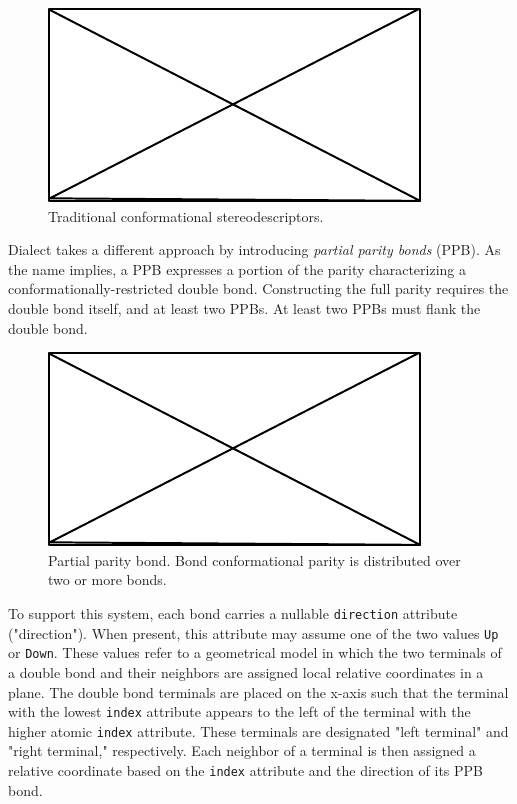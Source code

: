 \documentclass{article}
\def\ttt{\texttt}
\begin{document}
\begin{figure}
    \centering
    \includegraphics{filler}
    \caption{Traditional conformational stereodescriptors.}
    \label{fig:traditional-conformational-stereodescriptors}
\end{figure}

Dialect takes a different approach by introducing \textit{partial parity bonds} (PPB). As the name implies, a PPB expresses a portion of the parity characterizing a conformationally-restricted double bond. Constructing the full parity requires the double bond itself, and at least two PPBs. At least two PPBs must flank the double bond.

\begin{figure}
    \centering
    \includegraphics{filler}
    \caption{Partial parity bond. Bond conformational parity is distributed over two or more bonds.}
    \label{fig:partial-parity-bonds}
\end{figure}

To support this system, each bond carries a nullable \ttt{direction} attribute ("direction"). When present, this attribute may assume one of the two values \ttt{Up} or \ttt{Down}. These values refer to a geometrical model in which the two terminals of a double bond and their neighbors are assigned local relative coordinates in a plane. The double bond terminals are placed on the x-axis such that the terminal with the lowest \ttt{index} attribute appears to the left of the terminal with the higher atomic \ttt{index} attribute. These terminals are designated "left terminal" and "right terminal," respectively. Each neighbor of a terminal is then assigned a relative coordinate based on the \ttt{index} attribute and the direction of its PPB bond.
\end{document}
